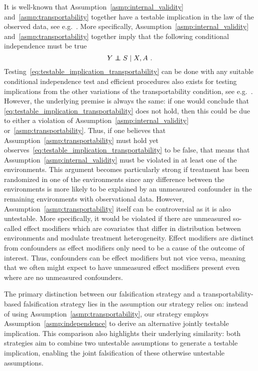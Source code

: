 \documentclass{article}
\begin{document}
It is well-known that Assumption~\ref*{asmp:internal_validity} and~\ref*{asmp:transportability} together have a testable implication in the law of the observed data, see e.g.~\citet{dahabreh2020benchmarking}. More specifically,  Assumption~\ref*{asmp:internal_validity} and~\ref*{asmp:transportability}  together imply that the following conditional independence must be true
\begin{equation}\label{eq:testable_implication_transportability}
    Y \indep S \mid X, A~.
\end{equation}
Testing~\eqref{eq:testable_implication_transportability} can be done with any suitable conditional independence test and efficient procedures also exists for testing implications from the other variations of the transportability condition, see e.g.~\citet{hussain2023falsification}. However, the underlying premise is always the same: if one would conclude that \eqref{eq:testable_implication_transportability} does not hold, then this could be due to either a violation of Assumption~\ref*{asmp:internal_validity} or~\ref*{asmp:transportability}. Thus, if one believes that Assumption~\ref*{asmp:transportability} must hold yet observes~\eqref{eq:testable_implication_transportability} to be false, that means that Assumption~\ref*{asmp:internal_validity} must be violated in at least one of the environments. This argument becomes particularly strong if treatment has been randomized in one of the environments since any difference between the environments is more likely to be explained by an unmeasured confounder in the remaining environments with observational data.  However,  Assumption~\ref*{asmp:transportability} itself can be controversial as it is also untestable. More specifically, it would be violated if there are unmeasured so-called effect modifiers which are covariates that differ in distribution between environments and modulate treatment heterogeneity. Effect modifiers are distinct from confounders as effect modifiers only need to be a cause of the outcome of interest. Thus, confounders can be effect modifiers but not vice versa, meaning that we often might expect to have unmeasured effect modifiers present even where are no unmeasured confounders.

The primary distinction between our falsification strategy and a transportability-based falsification strategy lies in the assumption our strategy relies on: instead of using Assumption~\ref*{asmp:transportability}, our strategy employs Assumption~\ref*{asmp:independence} to derive an alternative jointly testable implication. This comparison also highlights their underlying similarity: both strategies aim to combine two untestable assumptions to generate a testable implication, enabling the joint falsification of these otherwise untestable assumptions.
\end{document}
